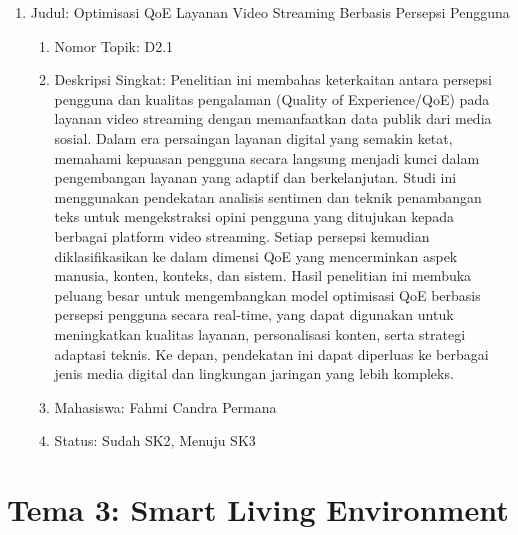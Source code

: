 \documentclass[
  letterpaper,
  DIV=11,
  numbers=noendperiod]{scrreprt}
\begin{document}
\begin{enumerate}
\def\labelenumi{\arabic{enumi}.}
\item
  Judul: Optimisasi QoE Layanan Video Streaming Berbasis Persepsi
  Pengguna

  \begin{enumerate}
  \def\labelenumii{\arabic{enumii}.}
  \item
    Nomor Topik: D2.1
  \item
    Deskripsi Singkat: Penelitian ini membahas keterkaitan antara
    persepsi pengguna dan kualitas pengalaman (Quality of
    Experience/QoE) pada layanan video streaming dengan memanfaatkan
    data publik dari media sosial. Dalam era persaingan layanan digital
    yang semakin ketat, memahami kepuasan pengguna secara langsung
    menjadi kunci dalam pengembangan layanan yang adaptif dan
    berkelanjutan. Studi ini menggunakan pendekatan analisis sentimen
    dan teknik penambangan teks untuk mengekstraksi opini pengguna yang
    ditujukan kepada berbagai platform video streaming. Setiap persepsi
    kemudian diklasifikasikan ke dalam dimensi QoE yang mencerminkan
    aspek manusia, konten, konteks, dan sistem. Hasil penelitian ini
    membuka peluang besar untuk mengembangkan model optimisasi QoE
    berbasis persepsi pengguna secara real-time, yang dapat digunakan
    untuk meningkatkan kualitas layanan, personalisasi konten, serta
    strategi adaptasi teknis. Ke depan, pendekatan ini dapat diperluas
    ke berbagai jenis media digital dan lingkungan jaringan yang lebih
    kompleks.
  \item
    Mahasiswa: Fahmi Candra Permana
  \item
    Status: Sudah SK2, Menuju SK3
  \end{enumerate}
\end{enumerate}

\section{Tema 3: Smart Living
Environment}\label{tema-3-smart-living-environment}
\end{document}
